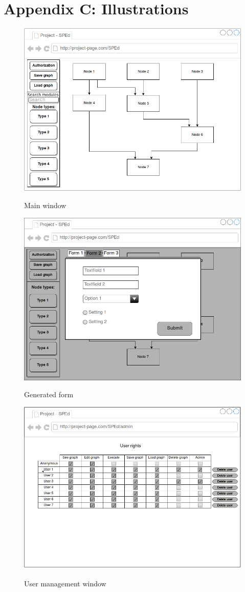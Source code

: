 \documentclass{article}
\begin{document}
	\section*{Appendix C: Illustrations}
	\begin{figure}[h!]
	    \includegraphics[width=\textwidth]{pic1.png}
	    \label{pic1}
	    \caption{Main window}
	\end{figure}
	\begin{figure}[h!]
	    \includegraphics[width=\textwidth]{pic2.png}
	    \label{pic2}
	    \caption{Generated form}
	\end{figure}
	\begin{figure}[h!]
	    \includegraphics[width=\textwidth]{pic3.png}
	    \label{pic3}
	    \caption{User management window}
	\end{figure}
\end{document}
